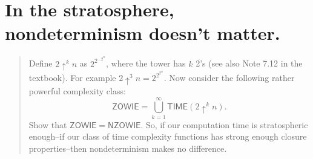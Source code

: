 

\maketitle
\thispagestyle{firststyle}
\vspace{-2.0cm}

\section{In the stratosphere, nondeterminism doesn’t matter.}
    \begin{quote}
    Define $2\uparrow^k n$ as $2^{2^{...2^n}}$, where the tower has $k$ 2's (see also Note 7.12 in the textbook).
    For example $2 \uparrow^3 n = 2^{2^{2^n}}$.
    Now consider the following rather powerful complexity class:
    \[
        \mathsf{ZOWIE} =
        \bigcup_{k=1}^\infty \mathsf{TIME}(2\uparrow^k n).
    \]
    Show that $\mathsf{ZOWIE} = \mathsf{NZOWIE}$.
    So, if our computation time is stratospheric enough--if our class of time complexity functions has strong enough closure properties--then nondeterminism makes no difference.
    \end{quote}
